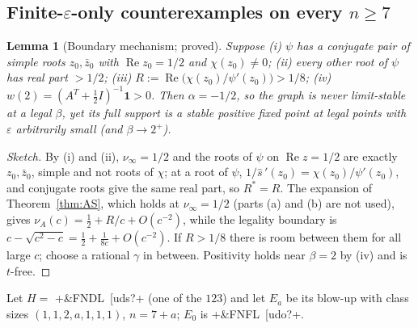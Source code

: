 \documentclass[11pt]{article}
\newtheorem{lemma}[theorem]{Lemma}
\theoremstyle{definition}
\newcommand{\one}{\mathbf{1}}
\newcommand{\eps}{\varepsilon}
\newcommand{\Rea}{\operatorname{Re}}
\begin{document}
{\subsection{Finite-\texorpdfstring{$\eps$}{eps}-only counterexamples on every \texorpdfstring{$n\ge7$}{n >= 7}}\label{sec:finiteeps}
\begin{lemma}[Boundary mechanism; proved]\label{lem:Bmech}
Suppose (i) $\psi$ has a conjugate pair of simple roots $z_0,\bar z_0$ with $\Rea z_0=1/2$ and $\chi(z_0)\ne0$; (ii) every other
root of $\psi$ has real part $>1/2$; (iii) $R:=\Rea\bigl(\chi(z_0)/\psi'(z_0)\bigr)>1/8$; (iv) $w(2)=(A^T+\tfrac12I)^{-1}\one>0$.
Then $\alpha=-1/2$, so the graph is never limit-stable at a legal $\beta$, yet its full support is a stable positive fixed point at
legal points with $\eps$ arbitrarily small (and $\beta\to2^+$).
\end{lemma}
\begin{proof}[Sketch]
By (i) and (ii), $\nu_\infty=1/2$ and the roots of $\psi$ on $\Rea z=1/2$ are exactly $z_0,\bar z_0$, simple and not roots
of $\chi$; at a root of $\psi$, $1/\hat s\,'(z_0)=\chi(z_0)/\psi'(z_0)$, and conjugate roots give the same real part, so
$R^*=R$. The expansion of Theorem~\ref{thm:AS}, which holds at $\nu_\infty=1/2$ (parts (a) and (b) are not used), gives
$\nu_A(c)=\tfrac12+R/c+O(c^{-2})$, while the legality boundary is
$c-\sqrt{c^2-c}=\tfrac12+\tfrac1{8c}+O(c^{-2})$. If $R>1/8$ there is room between them for all large $c$; choose a rational
$\gamma$ in between. Positivity holds near $\beta=2$ by (iv) and is $t$-free.
\end{proof}

Let $H=$ \dsix+&FNDL~[uds?+ (one of the $123$) and let $E_a$ be its blow-up with class sizes $(1,1,2,a,1,1,1)$, $n=7+a$; $E_0$ is
\dsix+&FNFL~[udo?+.

}
\end{document}
